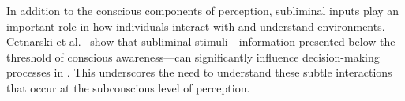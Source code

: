 In addition to the conscious components of perception, subliminal inputs play an important role in how individuals interact with and understand \MR environments.
Cetnarski et al.\ \cite{Cetnarski2014Subliminal} show that subliminal stimuli—information presented below the threshold of conscious awareness—can significantly influence decision-making processes in \MR. This underscores the need to understand these subtle interactions that occur at the subconscious level of perception.



